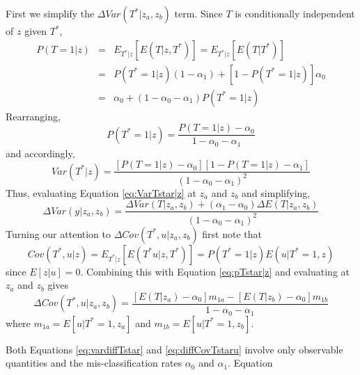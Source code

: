 First we simplify the $\Delta Var(T^*|z_a,z_b)$ term.
Since $T$ is conditionally independent of $z$ given $T^*$, 
\begin{eqnarray*}
  P(T=1|z) &=& E_{T^*|z}\left[E\left( T|z,T^* \right)  \right] = E_{T^*|z}\left[E\left( T|T^* \right)  \right]\\
  &=&  P\left( T^* = 1 | z \right) \left( 1-\alpha_1 \right) + \left[ 1 - P\left( T^*=1|z \right) \right] \alpha_0\\
  &=& \alpha_0 + \left( 1 - \alpha_0 - \alpha_1 \right) P(T^*=1|z)
\end{eqnarray*}
Rearranging,
\begin{equation}
  P(T^*=1|z) = \frac{P(T=1|z) - \alpha_0}{1 - \alpha_0 - \alpha_1}
  \label{eq:pTstar|z}
\end{equation}
and accordingly,
\begin{equation}
  Var(T^*|z) = \frac{\left[ P\left( T=1|z \right) - \alpha_0 \right]\left[ 1 - P\left( T=1|z \right) - \alpha_1 \right]}{\left( 1 - \alpha_0 - \alpha_1 \right)^2}
  \label{eq:VarTstar|z}
\end{equation}
Thus, evaluating Equation \ref{eq:VarTstar|z} at $z_a$ and $z_b$ and simplifying,
\begin{equation}
  \Delta Var(y|z_a,z_b) = \frac{\Delta Var(T|z_a,z_b) + \left( \alpha_1 - \alpha_0 \right) \Delta E(T|z_a, z_b) }{\left( 1 - \alpha_0 - \alpha_1 \right)^2}
  \label{eq:vardiffTstar}
\end{equation}
Turning our attention to $\Delta Cov(T^*,u|z_a,z_b)$ first note that
\begin{equation}
  Cov(T^*,u|z) = E_{T^*|z}\left[E\left( T^*u|z,T^* \right)  \right] = P(T^*=1|z)E\left( u|T^*=1,z \right) 
  \label{eq:covTstaru}
\end{equation}
since $E[z|u] = 0$.
Combining this with Equation \ref{eq:pTstar|z} and evaluating at $z_a$ and $z_b$ gives
\begin{equation}
  \Delta Cov(T^*,u|z_a,z_b) = \frac{\left[E\left( T|z_a \right) - \alpha_0\right] m_{1a} - \left[ E(T|z_b) - \alpha_0 \right] m_{1b} }{1 - \alpha_0 - \alpha_1}
  \label{eq:diffCovTstaru}
\end{equation}
where $m_{1a} = E\left[ u|T^*=1,z_a \right]$ and $m_{1b} = E[u|T^*=1,z_b]$.

Both Equations \ref{eq:vardiffTstar} and \ref{eq:diffCovTstaru} involve only observable quantities and the mis-classification rates $\alpha_0$ and $\alpha_1$.
Equation 
